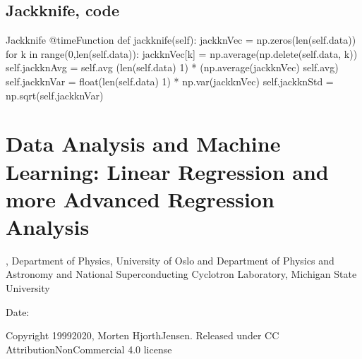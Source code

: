 \documentclass[letterpaper,10pt,english]{sphinxmanual}
\begin{document}
\subsection{Jackknife, code}
\label{\detokenize{chapter3:jackknife-code}}
\begin{sphinxVerbatim}[commandchars=\\\{\}]
    \PYGZsh{} Jackknife
        @timeFunction
        def jackknife(self):
            jackknVec = np.zeros(len(self.data))
            for k in range(0,len(self.data)):
                jackknVec[k] = np.average(np.delete(self.data, k))
            self.jackknAvg = self.avg \PYGZhy{} (len(self.data) \PYGZhy{} 1) * (np.average(jackknVec) \PYGZhy{} self.avg)
            self.jackknVar = float(len(self.data) \PYGZhy{} 1) * np.var(jackknVec)
            self.jackknStd = np.sqrt(self.jackknVar)
\end{sphinxVerbatim}




\section{Data Analysis and Machine Learning: Linear Regression and more Advanced Regression Analysis}
\label{\detokenize{chapter4:data-analysis-and-machine-learning-linear-regression-and-more-advanced-regression-analysis}}\label{\detokenize{chapter4::doc}}




, Department of Physics, University of Oslo and Department of Physics and Astronomy and National Superconducting Cyclotron Laboratory, Michigan State University

Date: 

Copyright 1999\sphinxhyphen{}2020, Morten Hjorth\sphinxhyphen{}Jensen. Released under CC Attribution\sphinxhyphen{}NonCommercial 4.0 license
\end{document}
